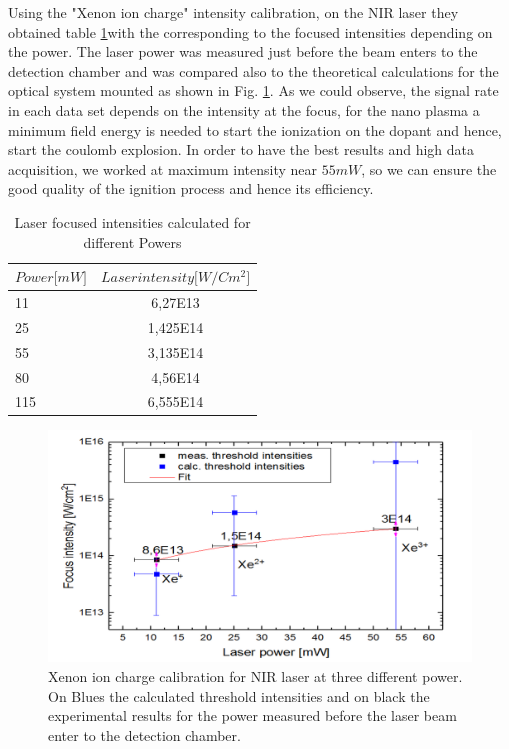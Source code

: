 Using the "Xenon ion charge" intensity calibration, on the NIR laser they obtained table \ref{tab:nirintens}with the corresponding to the focused intensities depending on the power. The laser power was measured just before the beam enters to the detection chamber and was compared also to the theoretical calculations for the optical system mounted as shown in Fig. \ref{fig:xeionchargecalib}. As we could observe, the signal rate in each data set depends on the intensity at the focus, for the nano plasma a minimum field energy is needed to start the ionization on the dopant and hence, start the coulomb explosion. In order to have the best results and high data acquisition, we worked at maximum intensity near $55mW$, so we can ensure the good quality of the ignition process and hence its efficiency.

\begin{table}[t]

\centering
\begin{tabular}{|l|c|}
\hline
\multicolumn{1}{|c|}{$Power{[}mW{]}$} & $Laser intensity {[}W/Cm^{2}{]}$ \\ \hline
11                                  & 6,27E13                                           \\ \hline
25                                  & 1,425E14                                          \\ \hline
55                                  & 3,135E14                                          \\ \hline
80                                  & 4,56E14                                           \\ \hline
115                                 & 6,555E14                                          \\ \hline
\end{tabular}
\caption[NIR laser power to intensities]{Laser focused intensities calculated for different Powers }
\label{tab:nirintens}
\end{table}


\begin{figure}[h!]
\centering
\includegraphics[width=10 cm]{../Images/Xeioncharges_intensitycalib.png} 
\caption[Xenon ion charge calibration for NIR] {Xenon ion charge calibration for NIR laser at three different power. On Blues the calculated threshold intensities and on black the experimental results for the power measured before the laser beam enter to the detection chamber.}
\label{fig:xeionchargecalib}
\end{figure}


